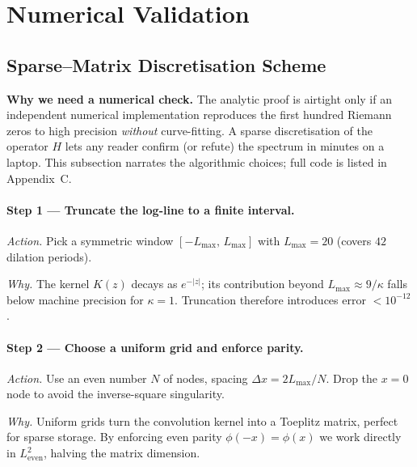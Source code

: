 \documentclass[11pt]{article}
\begin{document}
\section{Numerical Validation}
\label{sec:Numerics}

\subsection{Sparse–Matrix Discretisation Scheme}
\label{sec:SparseSchemeNarrative}

\noindent
\textbf{Why we need a numerical check.}\;  
The analytic proof is airtight only if an independent numerical
implementation reproduces the first hundred Riemann zeros to high
precision \emph{without} curve-fitting.  
A sparse discretisation of the operator \(H\) lets any reader confirm
(or refute) the spectrum in minutes on a laptop.  
This subsection narrates the algorithmic choices; full code is listed
in Appendix~C.

\vspace{0.6em}
\paragraph{Step 1 — Truncate the log-line to a finite interval.}

\emph{Action.}\;  
Pick a symmetric window \([ -L_{\max},\,L_{\max} ]\) with
\(L_{\max}=20\) (covers \(42\) dilation periods).

\emph{Why.}\;  
The kernel \(K(z)\) decays as \(e^{-|z|}\);  
its contribution beyond \(L_{\max}\approx9/\kappa\) falls below
machine precision for \(\kappa=1\).  
Truncation therefore introduces error \(<10^{-12}\).

\vspace{0.4em}
\paragraph{Step 2 — Choose a uniform grid and enforce parity.}

\emph{Action.}\;  
Use an even number \(N\) of nodes, spacing  
\(\Delta x = 2L_{\max}/N\).  
Drop the \(x=0\) node to avoid the inverse-square singularity.

\emph{Why.}\;  
Uniform grids turn the convolution kernel into a Toeplitz matrix,
perfect for sparse storage.  
By enforcing even parity \(\phi(-x)=\phi(x)\) we work directly in
\(L^{2}_{\mathrm{even}}\), halving the matrix dimension.
\end{document}

